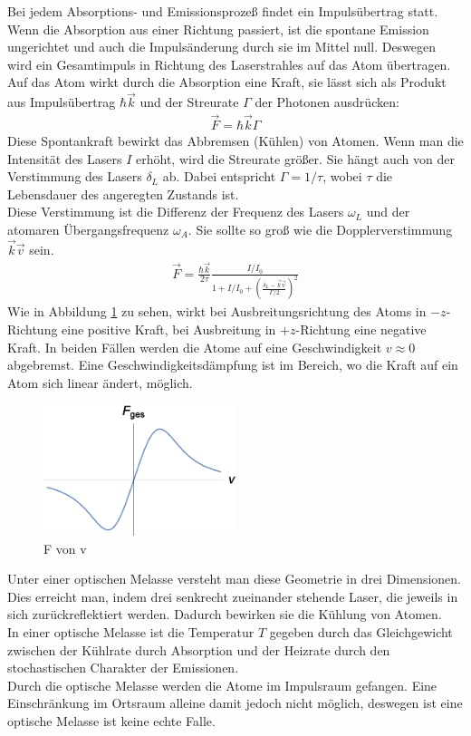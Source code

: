 \documentclass[12pt,a4paper]{article}
\begin{document}
  Bei jedem Absorptions- und Emissionsprozeß findet ein Impulsübertrag statt. Wenn die Absorption aus einer Richtung passiert, ist die spontane Emission ungerichtet und auch die Impulsänderung durch sie im Mittel null. Deswegen wird ein Gesamtimpuls in Richtung des Laserstrahles auf das Atom übertragen.
 \\Auf das Atom wirkt durch die Absorption eine Kraft, sie lässt sich als Produkt aus Impulsübertrag $\hbar\vec{k}$ und der Streurate $\Gamma$ der Photonen ausdrücken: 
   \begin{align*}
  \vec F=\hbar \vec k \Gamma
  \end{align*}
  Diese Spontankraft bewirkt das Abbremsen (Kühlen) von Atomen. Wenn man die Intensität des Lasers ${I}$ erhöht, wird die Streurate größer. Sie hängt auch von der Verstimmung des Lasers ${\delta_L}$ ab. Dabei entspricht ${\Gamma =1/ \tau}$, wobei ${\tau}$ die Lebensdauer des angeregten Zustands ist.
  \\Diese Verstimmung ist die Differenz der Frequenz des Lasers ${\omega_L}$ und der atomaren Übergangsfrequenz ${\omega_A}$. Sie sollte so groß wie die Dopplerverstimmung ${\vec k \vec v}$ sein.
   \begin{align*}
    \vec F=\frac{\hbar \vec k}{2 \tau} \frac{I/I_0}{1+I/I_0+(\frac{ \delta _L-\vec k \vec v}{\Gamma /2})^2}
  \end{align*}
  Wie in Abbildung \ref{fvonv} zu sehen, wirkt bei Ausbreitungsrichtung des Atoms in $-z$-Richtung eine positive Kraft, bei Ausbreitung in $+z$-Richtung eine negative Kraft. In beiden Fällen werden die Atome auf eine Geschwindigkeit ${v\approx 0}$ abgebremst. Eine Geschwindigkeitsdämpfung ist im Bereich, wo die Kraft auf ein Atom sich linear ändert, möglich.
   \begin{figure}[h!]
  \centering
  \includegraphics[width=0.5\textwidth]{fvonv.eps}
  \caption{F von v}
  \label{fvonv}
  \end{figure}
  \newpage
  Unter einer optischen Melasse versteht man diese Geometrie in drei Dimensionen. Dies erreicht man, indem drei senkrecht zueinander stehende Laser, die jeweils in sich zurückreflektiert werden. Dadurch bewirken sie die Kühlung von Atomen.
 \\In einer optische Melasse ist die Temperatur ${T}$ gegeben durch das Gleichgewicht zwischen der Kühlrate durch Absorption und der Heizrate durch den stochastischen Charakter der Emissionen.
 \\Durch die optische Melasse werden die Atome im Impulsraum gefangen. Eine Einschränkung im Ortsraum alleine damit jedoch nicht möglich, deswegen ist eine optische Melasse ist keine echte Falle.
 
\end{document}
